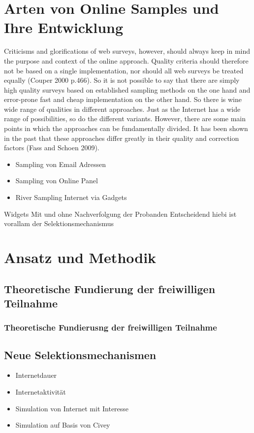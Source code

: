 \documentclass[a4paper , 11pt]{article}
\begin{document}
\section{Arten von Online Samples und Ihre Entwicklung }

Criticisms and glorifications of web surveys, however, should always keep in mind the purpose and context of the online approach. Quality criteria should therefore not be based on a single implementation, nor should all web surveys be treated equally (Couper 2000 p.466).
So it is not possible to say that there are simply high quality surveys based on established sampling methods on the one hand and error-prone fast and cheap implementation on the other hand. So there is wine wide range of qualities in different approaches. 
Just as the Internet has a wide range of possibilities, so do the different variants. However, there are some main points in which the approaches can be fundamentally divided. It has been shown in the past that these approaches differ greatly in their quality and correction factors (Fass and Schoen 2009).
\begin{itemize}
\item Sampling von Email Adressen
\item Sampling von Online Panel
\item River Sampling Internet via Gadgets
\end{itemize}
Widgets
Mit und ohne Nachverfolgung der Probanden
Entscheidend hiebi ist vorallam der Selektionsmechanismus
\section{Ansatz und Methodik}
\subsection{Theoretische Fundierung der freiwilligen Teilnahme }
\subsubsection{Theoretische Fundierusng der freiwilligen Teilnahme }
\subsection{Neue Selektionsmechanismen }
\begin{itemize}
\item Internetdauer
\item Internetaktivität
\item Simulation von Internet mit Interesse
\item Simulation auf Basis von Civey
\end{itemize}
\end{document}

